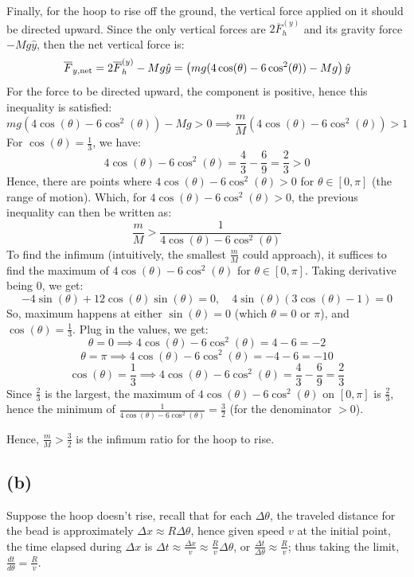 \documentclass{article}
\newcommand{\bF}{\overline{F}}
\begin{document}
\hfil

Finally, for the hoop to rise off the ground, the vertical force applied on it should be directed upward. Since the only vertical forces are $2\bF_h^{(y)}$ and its gravity force $-Mg\hat{y}$, then the net vertical force is:
$$\bF_{y,\textmd{net}} = 2\bF_h^{(y)}-Mg\hat{y} = \left(mg(4\cos(\theta)-6\cos^2(\theta))-Mg\right)\hat{y}$$
For the force to be directed upward, the component is positive, hence this inequality is satisfied:
$$mg(4\cos(\theta)-6\cos^2(\theta))-Mg>0 \implies \frac{m}{M}(4\cos(\theta)-6\cos^2(\theta))>1$$ 
For $\cos(\theta)= \frac{1}{3}$, we have:
$$4\cos(\theta)-6\cos^2(\theta) =\frac{4}{3}-\frac{6}{9} = \frac{2}{3}>0$$
Hence, there are points where $4\cos(\theta)-6\cos^2(\theta)>0$ for $\theta\in [0,\pi]$ (the range of motion). Which, for $4\cos(\theta)-6\cos^2(\theta)>0$, the previous inequality can then be written as:
$$\frac{m}{M}>\frac{1}{4\cos(\theta)-6\cos^2(\theta)}$$
To find the infimum (intuitively, the smallest $\frac{m}{M}$ could approach), it suffices to find the maximum of $4\cos(\theta)-6\cos^2(\theta)$ for $\theta\in [0,\pi]$. Taking derivative being $0$, we get:
$$-4\sin(\theta)+12\cos(\theta)\sin(\theta)=0,\quad 4\sin(\theta)(3\cos(\theta)-1)=0$$
So, maximum happens at either $\sin(\theta)=0$ (which $\theta=0$ or $\pi$), and $\cos(\theta)=\frac{1}{3}$. Plug in the values, we get:
$$\theta=0\implies 4\cos(\theta)-6\cos^2(\theta) = 4-6=-2$$
$$\theta=\pi\implies 4\cos(\theta)-6\cos^2(\theta)=-4-6 = -10$$
$$\cos(\theta)=\frac{1}{3}\implies 4\cos(\theta)-6\cos^2(\theta) = \frac{4}{3}-\frac{6}{9} = \frac{2}{3}$$
Since $\frac{2}{3}$ is the largest, the maximum of $4\cos(\theta)-6\cos^2(\theta)$ on $[0,\pi]$ is $\frac{2}{3}$, hence the minimum of $\frac{1}{4\cos(\theta)-6\cos^2(\theta)} = \frac{3}{2}$ (for the denominator $>0$).

Hence, $\frac{m}{M}>\frac{3}{2}$ is the infimum ratio for the hoop to rise.
\subsection*{(b)}
Suppose the hoop doesn't rise, recall that for each $\Delta\theta$, the traveled distance for the bead is approximately $\Delta x\approx R\Delta\theta$, hence given speed $v$ at the initial point, the time elapsed during $\Delta x$ is $\Delta t\approx \frac{\Delta x}{v} \approx \frac{R}{v}\Delta \theta$, or $\frac{\Delta t}{\Delta\theta}\approx \frac{R}{v}$; thus taking the limit, $\frac{dt}{d\theta}=\frac{R}{v}$. 

\end{document}
